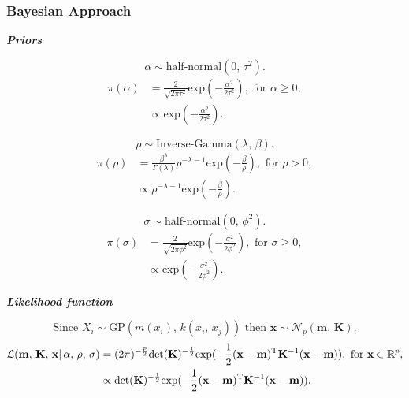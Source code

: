 \documentclass[a4paper, 10pt, fleqn]{article}
\begin{document}
\begin{flushleft}
         \subsubsection*{Bayesian Approach}

            \textbf{\textit{Priors}}

            \[\alpha \sim \text{half-normal}(0, \, \tau^2).\]
            \begin{align*}
               \pi(\alpha) 
               & = \frac{2}{\sqrt{2\pi\tau^2}} \text{exp}(-\frac{\alpha^2}{2\tau^2}), \text{ for } \alpha \geq 0,\\
               & \propto \text{exp}(-\frac{\alpha^2}{2\tau^2}).
            \end{align*}

            \[\rho \sim \text{Inverse-Gamma}(\lambda, \, \beta).\]
            \begin{align*}
               \pi(\rho)
               & = \frac{\beta^{\lambda}}{\Gamma(\lambda)} \rho^{-\lambda-1} \text{exp}(-\frac{\beta}{\rho}), \text{ for } \rho > 0,\\
               & \propto \rho^{-\lambda-1} \text{exp}(-\frac{\beta}{\rho}).
            \end{align*}

            \[\sigma \sim \text{half-normal}(0, \, \phi^2).\]
            \begin{align*}
               \pi(\sigma)
               & = \frac{2}{\sqrt{2\pi\phi^2}} \text{exp}(-\frac{\sigma^2}{2\phi^2}), \text{ for } \sigma \geq 0,\\
               & \propto \text{exp}(-\frac{\sigma^2}{2\phi^2}).
            \end{align*}

            \textbf{\textit{Likelihood function}}

            \[\text{Since } X_{i} \sim \text{GP}(m(x_{i}) ,\, k(x_{i},\, x_{j})) \text{ then } \mathbf{x} \sim \mathcal{N}_{p}(\mathbf{m} ,\, \mathbf{K}).\]
            \begin{align*}
               \mathcal{L}(\mathbf{m} ,\, \mathbf{K} ,\, \mathbf{x}| \, \alpha ,\, \rho ,\, \sigma)
               & = (2\pi)^{-\frac{p}{2}}\text{det}(\mathbf{K})^{-\frac{1}{2}} 
               \text{exp} (-\frac{1}{2} (\mathbf{x} - \mathbf{m})^{\text{\text{T}}} \mathbf{K}^{-1} (\mathbf{x} - \mathbf{m})),
               \text{ for } \mathbf{x} \in \mathbb{R}^{p},\\
               & \propto \text{det}(\mathbf{K})^{-\frac{1}{2}} 
               \text{exp} (-\frac{1}{2} (\mathbf{x} - \mathbf{m})^{\text{\text{T}}} \mathbf{K}^{-1} (\mathbf{x} - \mathbf{m})).
            \end{align*}


\end{flushleft}
\end{document}
